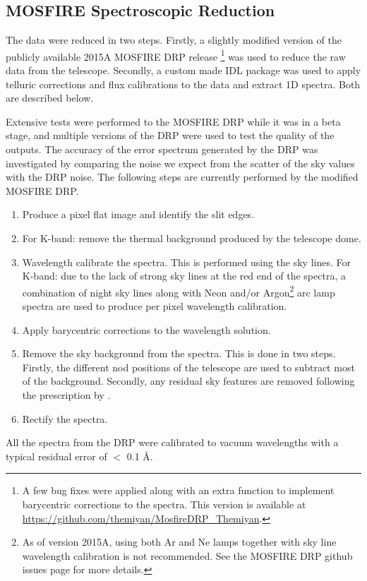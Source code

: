 \documentclass[iop]{emulateapj}
\begin{document}
 
\subsection{MOSFIRE Spectroscopic Reduction}
\label{data_reduction}

The data were reduced in two steps. 
Firstly, a slightly modified version of the publicly available 2015A MOSFIRE DRP release \footnote{A few bug fixes were applied along with an extra function to implement barycentric corrections to the spectra. This version is available at \url{https://github.com/themiyan/MosfireDRP\_Themiyan}.} was used to reduce the raw data from the telescope.
Secondly, a custom made IDL package was used to apply telluric corrections and flux calibrations to the data and extract 1D spectra. Both are described below. 

Extensive tests were performed to the MOSFIRE DRP while it was in a beta stage, and multiple versions of the DRP were used to test the quality of the outputs. 
The accuracy of the error spectrum generated by the DRP was investigated by comparing the noise we expect from the scatter of the sky values with the DRP noise. 
The following steps are currently performed by the modified MOSFIRE DRP. 
\begin{enumerate}
\item Produce a pixel flat image and identify the slit edges. 
\item For K-band: remove the thermal background produced by the telescope dome. 
\item Wavelength calibrate the spectra. This is performed using the sky lines. For K-band: due to the lack of strong sky lines at the red end of the spectra, a combination of night sky lines along with Neon and/or Argon\footnote{As of version 2015A, using both Ar and Ne lamps together with sky line wavelength calibration is not recommended. See the MOSFIRE DRP github issues page for more details.} arc lamp spectra are used to produce per pixel wavelength calibration.
\item Apply barycentric corrections to the wavelength solution. 
\item Remove the sky background from the spectra. This is done in two steps. Firstly, the different nod positions of the telescope are used to subtract most of the background. 
Secondly, any residual sky features are removed following the prescription by \citet{Kelson2003}.
\item Rectify the spectra.
\end{enumerate}
All the spectra from the DRP were calibrated to vacuum wavelengths with a typical residual error of $<$ 0.1 \AA. 
\end{document}
